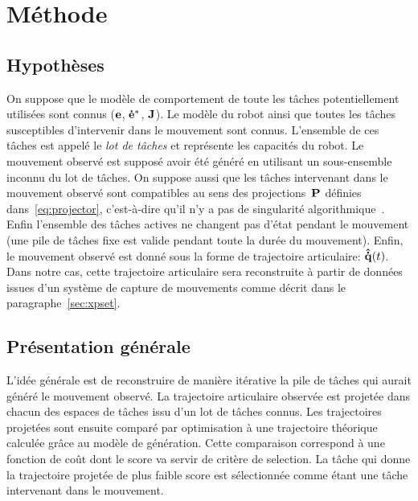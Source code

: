 \section{M\'ethode}
\label{chap:taskReco}
\subsection{Hypothèses}
On suppose que le modèle de comportement de toute les t\^aches potentiellement utilisées sont connus
(${\mathbf{e}}$, ${\mathbf{\dot{e}^*}}$, ${\mathbf{J}}$). Le modèle du robot
ainsi que toutes les t\^aches susceptibles d'intervenir
dans le mouvement sont connus. L'ensemble de ces t\^aches est appelé le \emph{lot de t\^aches}
et représente les capacités du robot.
Le mouvement observé est supposé avoir été généré en utilisant un sous-ensemble
inconnu du lot de t\^aches.
On suppose aussi que les t\^aches intervenant dans le mouvement observé sont compatibles
au sens des projections~${\mathbf{P}}$ définies dans~\eqref{eq:projector},
c'est-à-dire qu'il n'y a pas de singularité algorithmique~\cite{chiaverini97}. Enfin
l'ensemble des t\^aches actives ne changent pas d'état pendant le mouvement
(une pile de t\^aches fixe est valide pendant toute la durée du mouvement).
Enfin, le mouvement observé est donné sous la forme de trajectoire articulaire: ${\mathbf{\hat{\dot{q}}}}(t)$.
Dans notre cas, cette trajectoire articulaire sera reconstruite à partir de données issues
d'un système de capture de mouvements comme décrit dans le paragraphe~\ref{sec:xpset}.

\subsection{Présentation générale}
\label{sec:alg1:selec}
L'idée générale est de reconstruire de manière itérative
la pile de t\^aches qui aurait généré le mouvement observé.
La trajectoire articulaire observée est projetée dans 
chacun des espaces de t\^aches issu d'un lot de t\^aches connus.
Les trajectoires projetées sont ensuite comparé par optimisation à une trajectoire
théorique calculée gr\^ace au modèle de génération.
Cette comparaison correspond à une fonction de coût dont le score
va servir de critère de selection. La t\^ache qui donne la trajectoire
projetée de plus faible score est sélectionnée comme étant une
t\^ache intervenant dans le mouvement.

